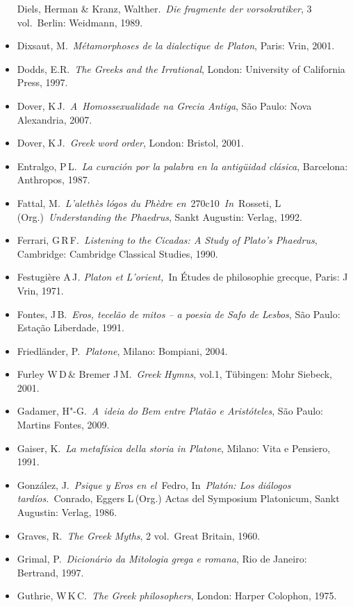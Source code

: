 \begin{itemize}
  Diels, Herman \& Kranz, Walther.~\emph{Die fragmente der
  vorsokratiker}, 3 vol.~Berlin: Weidmann, 1989.
\item
  Dixsaut, M.~\emph{Métamorphoses de la dialectique de Platon}, Paris:
  Vrin, 2001.
\item
  Dodds, E.R.~\emph{The Greeks and the Irrational}, London: University
  of California Press, 1997.
\item
  Dover, K\,J.~\emph{A~Homossexualidade na Grecia Antiga}, São Paulo:
  Nova Alexandria, 2007.
\item
  Dover, K\,J.~\emph{Greek word order}, London: Bristol, 2001.
\item
  Entralgo, P\,L.~\emph{La curación por la palabra en la antigüidad
  clásica}, Barcelona: Anthropos, 1987.
\item
  Fattal, M.~\emph{L'alethès lógos du Phèdre
  en}~270c10~\emph{In}~Rosseti, L\,(Org.)~\emph{Understanding the
  Phaedrus}, Sankt Augustin: Verlag, 1992.
\item
  Ferrari, G\,R\,F.~\emph{Listening to the Cicadas: A Study of Plato's
  Phaedrus}, Cambridge: Cambridge Classical Studies, 1990.
\item
  Festugière A\,J\emph{. Platon et L'orient,~}In Études de philosophie
  grecque, Paris: J\,Vrin, 1971.
\item
  Fontes, J\,B.~\emph{Eros, tecelão de mitos -- a poesia de Safo de
  Lesbos}, São Paulo: Estação Liberdade, 1991.
\item
  Friedländer, P.~\emph{Platone}, Milano: Bompiani, 2004.
\item
  Furley W\,D\,\& Bremer J\,M.~\emph{Greek Hymns}, vol.1, Tübingen: Mohr
  Siebeck, 2001.
\item
  Gadamer, H"-G.~\emph{A~ideia do Bem entre Platão e Aristóteles}, São
  Paulo: Martins Fontes, 2009.
\item
  Gaiser, K.~\emph{La metafísica della storia in Platone}, Milano: Vita
  e Pensiero, 1991.
\item
  González, J.~\emph{Psique y Eros en el~}Fedro, In~\emph{Platón: Los
  diálogos tardíos.}~Conrado, Eggers L\,(Org.) Actas del Symposium
  Platonicum, Sankt Augustin: Verlag, 1986.
\item
  Graves, R.~\emph{The Greek Myths}, 2 vol.~Great Britain, 1960.
\item
  Grimal, P.~\emph{Dicionário da Mitologia grega e romana}, Rio de
  Janeiro: Bertrand, 1997.
\item
  Guthrie, W\,K\,C.~\emph{The Greek philosophers}, London: Harper
  Colophon, 1975.

\end{itemize}

